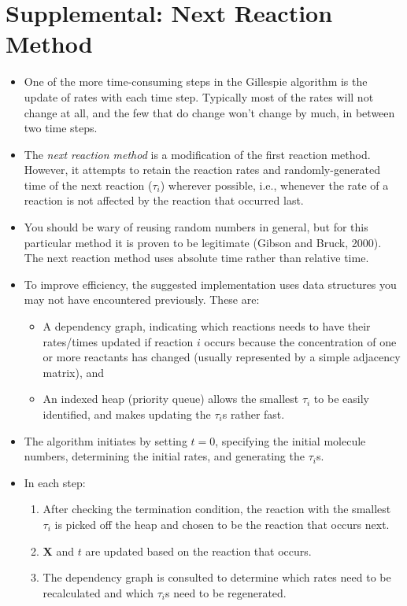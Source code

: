 \documentclass{article}
\begin{document}
\section*{Supplemental: Next Reaction Method}
\begin{itemize}
\item One of the more time-consuming steps in the Gillespie algorithm is the update of rates with each time step. Typically most of the rates will not change at all, and the few that do change won't change by much, in between two time steps. 
\item The \textit{next reaction method} is a modification of the first reaction method. However, it attempts to retain the reaction rates and randomly-generated time of the next reaction ($\tau_i$) wherever possible, i.e., whenever the rate of a reaction is not affected by the reaction that occurred last.
\item You should be wary of reusing random numbers in general, but for this particular method it is proven to be legitimate (Gibson and Bruck, 2000). The next reaction method uses absolute time rather than relative time.
\item To improve efficiency, the suggested implementation uses data structures you may not have encountered previously. These are:
\begin{itemize}
\item A dependency graph, indicating which reactions needs to have their rates/times updated if reaction $i$ occurs because the concentration of one or more reactants has changed (usually represented by a simple adjacency matrix), and
\item An indexed heap (priority queue) allows the smallest $\tau_i$ to be easily identified, and makes updating the $\tau_i$s rather fast.
\end{itemize}
\item The algorithm initiates by setting $t=0$, specifying the initial molecule numbers, determining the initial rates, and generating the $\tau_i$s.
\item In each step:
\begin{enumerate}
\item After checking the termination condition, the reaction with the smallest $\tau_i$ is picked off the heap and chosen to be the reaction that occurs next.
\item  $\mathbf{X}$ and $t$ are updated based on the reaction that occurs.
\item The dependency graph is consulted to determine which rates need to be recalculated and which $\tau_i$s need to be regenerated.
\end{enumerate}
\end{itemize}
\end{document}
